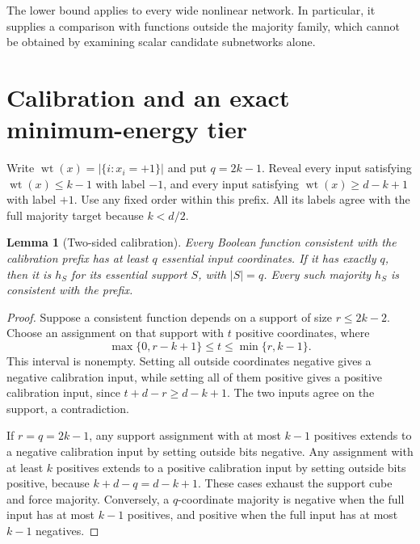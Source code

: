 \documentclass[11pt]{article}
\newtheorem{lemma}[theorem]{Lemma}
\newcommand{\wt}{\operatorname{wt}}
\begin{document}
The lower bound applies to every wide nonlinear network. In particular,
it supplies a comparison with functions outside the majority family,
which cannot be obtained by examining scalar candidate subnetworks alone.

\section{Calibration and an exact minimum-energy tier}

Write $\wt(x)=|\{i:x_i=+1\}|$ and put $q=2k-1$.
Reveal every input satisfying $\wt(x)\le k-1$ with label $-1$,
and every input satisfying $\wt(x)\ge d-k+1$ with label $+1$.
Use any fixed order within this prefix. All its labels agree with
the full majority target because $k<d/2$.

\begin{lemma}[Two-sided calibration]\label{lem:calibration}
Every Boolean function consistent with the calibration prefix has at
least $q$ essential input coordinates. If it has exactly $q$, then it
is $h_S$ for its essential support $S$, with $|S|=q$.
Every such majority $h_S$ is consistent with the prefix.
\end{lemma}
\begin{proof}
Suppose a consistent function depends on a support of size
$r\le2k-2$. Choose an assignment on that support with $t$ positive
coordinates, where
\[
 \max\{0,r-k+1\}\le t\le\min\{r,k-1\}.
\]
This interval is nonempty. Setting all outside coordinates negative
gives a negative calibration input, while setting all of them positive
gives a positive calibration input, since $t+d-r\ge d-k+1$.
The two inputs agree on the support, a contradiction.

If $r=q=2k-1$, any support assignment with at most $k-1$ positives
extends to a negative calibration input by setting outside bits
negative. Any assignment with at least $k$ positives extends to a
positive calibration input by setting outside bits positive, because
$k+d-q=d-k+1$. These cases exhaust the support cube and force
majority. Conversely, a $q$-coordinate majority is negative when
the full input has at most $k-1$ positives, and positive when the
full input has at most $k-1$ negatives.
\end{proof}
\end{document}
